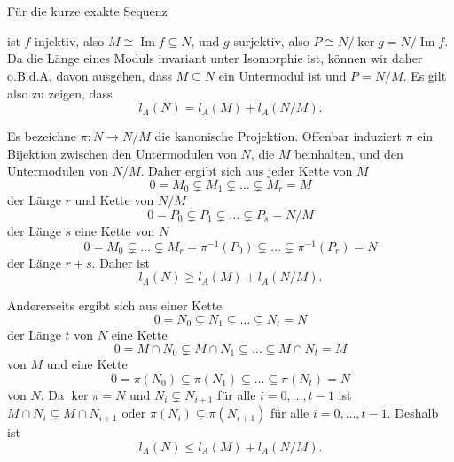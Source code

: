 \documentclass[a4paper,10pt]{article}
\theoremstyle{definition}
\newcommand{\Img}{\operatorname{Im}}
\begin{document}
\section{}





\section{}
Für die kurze exakte Sequenz
\begin{center}
\end{center}
ist $f$ injektiv, also $M \cong \Img f \subseteq N$, und $g$ surjektiv, also $P \cong N / \ker g = N / \Img f$. Da die Länge eines Moduls invariant unter Isomorphie ist, können wir daher o.B.d.A. davon ausgehen, dass $M \subseteq N$ ein Untermodul ist und $P = N/M$. Es gilt also zu zeigen, dass
\[
 l_A(N) = l_A(M) + l_A(N/M).
\]

Es bezeichne $\pi : N \rightarrow N/M$ die kanonische Projektion. Offenbar induziert $\pi$ ein Bijektion zwischen den Untermodulen von $N$, die $M$ beinhalten, und den Untermodulen von $N/M$. Daher ergibt sich aus jeder Kette von $M$
\[
 0 = M_0 \subsetneq M_1 \subsetneq \ldots \subsetneq M_r = M
\]
der Länge $r$ und Kette von $N/M$
\[
 0 = P_0 \subsetneq P_1 \subsetneq \ldots \subsetneq P_s = N/M
\]
der Länge $s$ eine Kette von $N$
\[
 0 = M_0 \subsetneq \ldots \subsetneq M_r = \pi^{-1}(P_0) \subsetneq \ldots \subsetneq \pi^{-1}(P_r) = N
\]
der Länge $r+s$. Daher ist
\[
 l_A(N) \geq l_A(M) + l_A(N/M).
\]

Andererseits ergibt sich aus einer Kette
\[
 0 = N_0 \subsetneq N_1 \subsetneq \ldots \subsetneq N_t = N
\]
der Länge $t$ von $N$ eine Kette
\[
 0 = M \cap N_0 \subsetneq M \cap N_1 \subseteq \ldots \subseteq M \cap N_t = M
\]
von $M$ und eine Kette
\[
 0 = \pi(N_0) \subseteq \pi(N_1) \subseteq \ldots \subseteq \pi(N_t) = N
\]
von $N$. Da $\ker \pi = N$ und $N_i \subsetneq N_{i+1}$ für alle $i=0, \ldots, t-1$ ist $M \cap N_i \subsetneq M \cap N_{i+1}$ oder $\pi(N_i) \subsetneq \pi(N_{i+1})$ für alle $i=0, \ldots, t-1$. Deshalb ist
\[
 l_A(N) \leq l_A(M) + l_A(N/M).
\]
\end{document}
